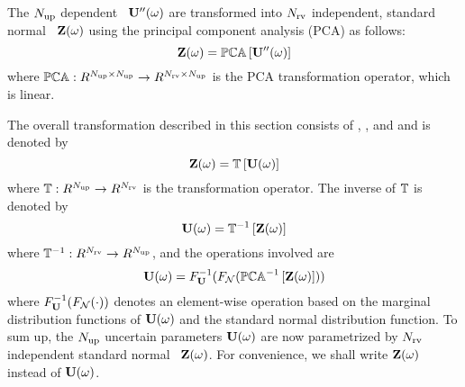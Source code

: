  The ${N_\text{up}}$ dependent \rvs\ $\mathbf{U}''(\omega)$ are transformed into ${N_\text{rv}}$ independent, standard normal \rvs\ $\mathbf{Z}(\omega)$ using the principal component analysis (PCA) as follows:
\begin{equation} \elabel{independent-normal}
  \vZ(\o) = \oPCA{\vU''(\o)}
\end{equation}
where $\oPCA: \real^{\Nup \times \Nup} \to \real^{\Nrv \times \Nup}$ is the PCA transformation operator, which is linear.

The overall transformation described in this section consists of , , and  and is denoted by
\[
  \vZ(\o) = \oT{\vU(\o)}
\]
where $\oT: \real^\Nup \to \real^\Nrv$ is the transformation operator. The inverse of $\oT$ is denoted by
\[
  \vU(\o) = \oInvT{\vZ(\o)}
\]
where $\oInvT: \real^\Nrv \to \real^\Nup$, and the operations involved are
\[
  \vU(\o) = \CDF_{\vU}^{-1}(\CDF_\normal(\oInvPCA{\vZ(\o)}))
\]
where $F^{-1}_{\mathbf{U}}(F_{\mathcal{N}}(\cdot))$ denotes an element-wise operation based on the marginal distribution functions of $\mathbf{U}(\omega)$ and the standard normal distribution function. To sum up, the ${N_\text{up}}$ uncertain parameters $\mathbf{U}(\omega)$ are now parametrized by ${N_\text{rv}}$ independent standard normal \rvs\ $\mathbf{Z}(\omega)$. For convenience, we shall write $\mathbf{Z}(\omega)$ instead of $\mathbf{U}(\omega)$.

